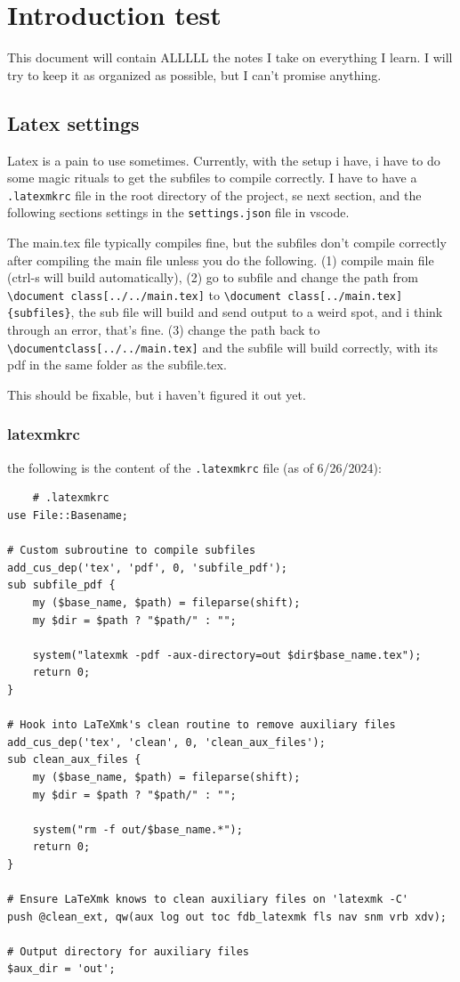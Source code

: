 \documentclass[../../main.tex]{subfiles} %
\begin{document}
\chapter{Introduction test}

This document will contain ALLLLL the notes I take on everything I learn. I will try to keep it as organized as possible, but I can't promise anything.

\section{Latex settings}
Latex is a pain to use sometimes. Currently, with the setup i have, i have to do some magic rituals to get the subfiles to compile correctly. I have to have a \texttt{.latexmkrc} file in the root directory of the project, se next section, and the following sections settings in the \texttt{settings.json} file in vscode.

The main.tex file typically compiles fine, but the subfiles don't compile correctly after compiling the main file unless you do the following. (1) compile main file (ctrl-s will build automatically), (2) go to subfile and change the path from \verb|\document class[../../main.tex]| to \verb|\document class[../main.tex]{subfiles}|, the sub file will build and send output to a weird spot, and i think through an error, that's fine. (3) change the path back to \verb|\documentclass[../../main.tex]| and the subfile will build correctly, with its pdf in the same folder as the subfile.tex. 

This should be fixable, but i haven't figured it out yet.
\subsection{latexmkrc}
the following is the content of the \texttt{.latexmkrc} file (as of 6/26/2024):
\begin{lstlisting}
    # .latexmkrc
use File::Basename;

# Custom subroutine to compile subfiles
add_cus_dep('tex', 'pdf', 0, 'subfile_pdf');
sub subfile_pdf {
    my ($base_name, $path) = fileparse(shift);
    my $dir = $path ? "$path/" : "";

    system("latexmk -pdf -aux-directory=out $dir$base_name.tex");
    return 0;
}

# Hook into LaTeXmk's clean routine to remove auxiliary files
add_cus_dep('tex', 'clean', 0, 'clean_aux_files');
sub clean_aux_files {
    my ($base_name, $path) = fileparse(shift);
    my $dir = $path ? "$path/" : "";

    system("rm -f out/$base_name.*");
    return 0;
}

# Ensure LaTeXmk knows to clean auxiliary files on 'latexmk -C'
push @clean_ext, qw(aux log out toc fdb_latexmk fls nav snm vrb xdv);

# Output directory for auxiliary files
$aux_dir = 'out';
\end{lstlisting}
\end{document}
